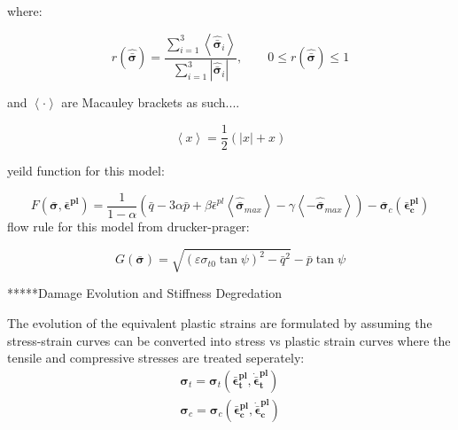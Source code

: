 where:

\begin{equation}
r\left(\hat{\boldsymbol{\bar{\sigma}}}\right)=\frac{\sum_{i=1}^{3}\left\langle \hat{\boldsymbol{\bar{\sigma}}}_{i}\right\rangle }{\sum_{i=1}^{3}\left|\hat{\boldsymbol{\bar{\sigma}}}_{i}\right|},\qquad0\leq r\left(\hat{\boldsymbol{\bar{\sigma}}}\right)\leq1\label{eqn:const9-2}
\end{equation}


and $\left\langle \cdotp\right\rangle $ are Macauley brackets as
such....

\begin{equation}
\left\langle x\right\rangle =\frac{1}{2}\left(\left|x\right|+x\right)\label{eqn:const9-3}
\end{equation}


yeild function for this model:

\begin{equation}
F\left(\boldsymbol{\bar{\sigma}},\boldsymbol{\bar{\epsilon}^{pl}}\right)=\frac{1}{1-\alpha}\left(\bar{q}-3\alpha\bar{p}+\beta\bar{\epsilon}^{pl}\left\langle \hat{\boldsymbol{\bar{\sigma}}}_{max}\right\rangle -\gamma\left\langle -\hat{\boldsymbol{\bar{\sigma}}}_{max}\right\rangle \right)-\bar{\boldsymbol{\sigma}}_{c}\left(\boldsymbol{\bar{\epsilon}_{c}^{pl}}\right)\label{eqn:const10}
\end{equation}
flow rule for this model from drucker-prager:

\begin{equation}
G\left(\boldsymbol{\bar{\sigma}}\right)=\sqrt{\left(\varepsilon\sigma_{t0}\tan\psi\right)^{2}-\bar{q}^{2}}-\bar{p}\tan\psi\label{eqn:const11}
\end{equation}


{*}{*}{*}{*}{*}Damage Evolution and Stiffness Degredation

The evolution of the equivalent plastic strains are formulated by
assuming the stress-strain curves can be converted into stress vs
plastic strain curves where the tensile and compressive stresses are
treated seperately: 
\begin{equation}
\begin{array}{c}
\boldsymbol{\sigma}_{t}=\boldsymbol{\sigma}_{t}\left(\boldsymbol{\bar{\epsilon}_{t}^{pl}},\boldsymbol{\dot{\bar{\epsilon}}_{t}^{pl}}\right)\\
\boldsymbol{\sigma}_{c}=\boldsymbol{\sigma}_{c}\left(\boldsymbol{\bar{\epsilon}_{c}^{pl}},\boldsymbol{\dot{\bar{\epsilon}}_{c}^{pl}}\right)
\end{array}
\label{eqn:dam1}
\end{equation}


